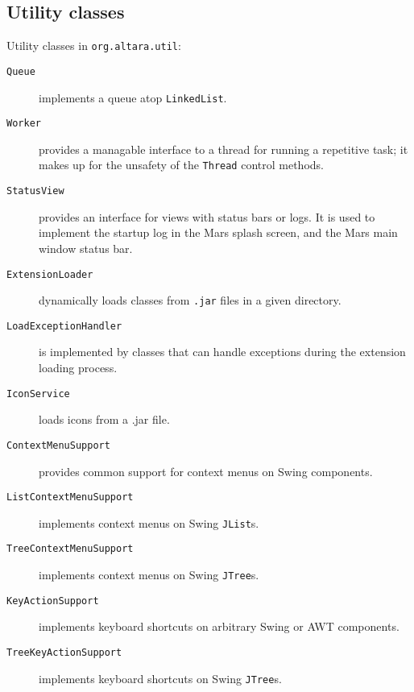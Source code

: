 \documentclass{article}
\newcommand{\filename}[1]{{\tt #1}}
\newcommand{\identifier}[1]{{\tt #1}}
\newcommand{\openclasstable}{\begin{description}}
\newcommand{\closeclasstable}{\end{description}}
\newcommand{\classdesc}[2]{ \item[\identifier{#1}]{#2} }
\begin{document}
\subsection{Utility classes}
Utility classes in \identifier{org.altara.util}:
\openclasstable
\classdesc{Queue}{implements a queue atop \identifier{LinkedList}.}
\classdesc{Worker}{provides a managable interface to a thread for
  running a repetitive task; it makes up for the unsafety of the
  \identifier{Thread} control methods.}
\classdesc{StatusView}{provides an interface for views with status
  bars or logs. It is used to implement the startup log in the Mars
  splash screen, and the Mars main window status bar.}
\classdesc{ExtensionLoader}{dynamically loads classes from
  \filename{.jar} files in a given directory.}
\classdesc{LoadExceptionHandler}{is implemented by classes that can
  handle exceptions during the extension loading process.}
\classdesc{IconService}{loads icons from a .jar file.}
\classdesc{ContextMenuSupport}{provides common support for context
  menus on Swing components.}
\classdesc{ListContextMenuSupport}{implements context menus on Swing
  \identifier{JList}s.}
\classdesc{TreeContextMenuSupport}{implements context menus on Swing
  \identifier{JTree}s.}
\classdesc{KeyActionSupport}{implements keyboard shortcuts on
  arbitrary Swing or AWT components.}
\classdesc{TreeKeyActionSupport}{implements keyboard shortcuts on
  Swing \identifier{JTree}s.}

\closeclasstable
\end{document}
